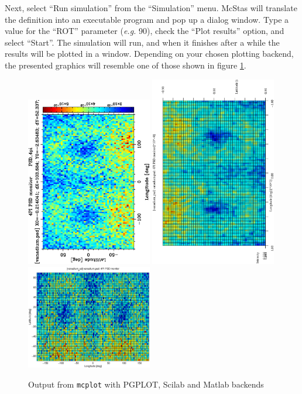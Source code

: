 Next, select ``Run simulation'' from the ``Simulation'' menu.
McStas will translate the definition into an executable program and pop
up a dialog window. Type a value for the ``ROT'' parameter ({\em e.g.}
90), check the ``Plot results'' option, and select ``Start''. The
simulation will run, and when it finishes after a while the results will
be plotted in a window. Depending on your chosen plotting backend, the
presented graphics will resemble one of those shown in figure
\ref{fig:mcplot_figs}.
\begin{figure}[htb!]
  \begin{center}
    \includegraphics[angle=-90,width=0.49\textwidth]{figures/mcplot_PGPLOT.ps}
    \includegraphics[angle=-90,width=0.49\textwidth]{figures/mcplot_Scilab.eps}
    \includegraphics[width=0.49\textwidth]{figures/mcplot_Matlab.eps}
  \end{center}
\caption{Output from \texttt{mcplot} with PGPLOT, Scilab and Matlab backends}
\label{fig:mcplot_figs}
\end{figure}
